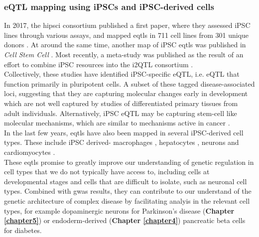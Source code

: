 \subsubsection{eQTL mapping using iPSCs and iPSC-derived cells}

In 2017, the \gls{hipsci} consortium published a first paper, where they assessed iPSC lines through various assays, and mapped \glspl{eqtl} in 711 cell lines from 301 unique donors \cite{kilpinen2017common}.
At around the same time, another map of iPSC \glspl{eqtl} was published in \textit{Cell Stem Cell} \cite{deboever2017large}.
Most recently, a meta-study was published as the result of an effort to combine iPSC resources into the i2QTL consortium \cite{bonder2019systematic}.\\

Collectively, these studies have identified iPSC-specific eQTL, i.e. eQTL that function primarily in pluripotent cells.
A subset of these tagged disease-associated loci, suggesting that they are capturing molecular changes early in development which are not well captured by studies of differentiated primary tissues from adult individuals. 
Alternatively, iPSC eQTL may be capturing stem-cell like molecular mechanisms, which are similar to mechanisms active in cancer \cite{kilpinen2017common}. \\


In the last few years, \glspl{eqtl} have also been mapped in several iPSC-derived cell types.
These include iPSC derived-
macrophages \cite{alasoo2018shared},
hepatocytes \cite{pashos2017large},
neurons \cite{schwartzentruber2018molecular}
and
cardiomyocytes \cite{strober2019dynamic, banovich2018impact}.\\

These \glspl{eqtl} promise to greatly improve our understanding of genetic regulation in cell types that we do not typically have access to, including cells at developmental stages and cells that are difficult to isolate, such as neuronal cell types.
Combined with \gls{gwas} results, they can contribute to our understand of the genetic architecture of complex disease by facilitating analyis in the relevant cell types, for example dopaminergic neurons for Parkinson's disease (\textbf{Chapter
\ref{chapter5}})
or endoderm-derived (\textbf{Chapter 
\ref{chapter4}})
pancreatic beta cells for diabetes.


